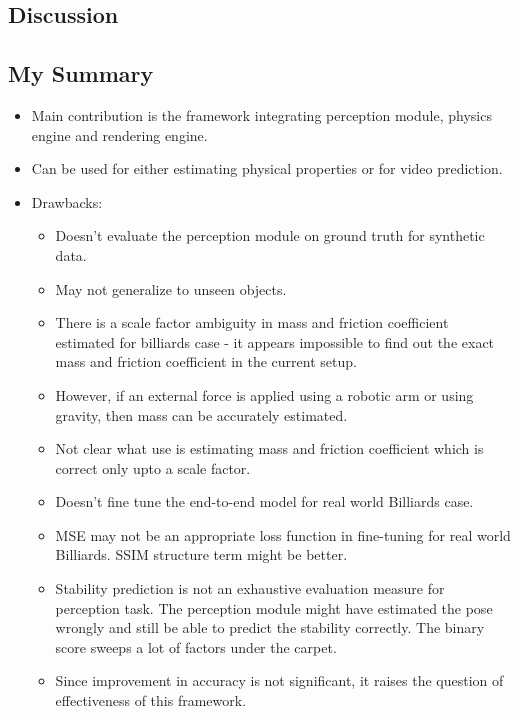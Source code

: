\documentclass{article}
\begin{document}
    \subsection{Discussion}\label{subsec:Learning_to_See_Physics_via_Visual_De_animation:discussion}

    \subsection{My Summary}\label{subsec:Learning_to_See_Physics_via_Visual_De_animation:my-summary}
    \begin{itemize}
        \item Main contribution is the framework integrating perception module, physics engine and rendering engine.
        \item Can be used for either estimating physical properties or for video prediction.
        \item Drawbacks:
        \begin{itemize}
            \item Doesn't evaluate the perception module on ground truth for synthetic data.
            \item May not generalize to unseen objects.
            \item There is a scale factor ambiguity in mass and friction coefficient estimated for billiards case - it appears impossible to find out the exact mass and friction coefficient in the current setup.
            \item However, if an external force is applied using a robotic arm or using gravity, then mass can be accurately estimated.
            \item Not clear what use is estimating mass and friction coefficient which is correct only upto a scale factor.
            \item Doesn't fine tune the end-to-end model for real world Billiards case.
            \item MSE may not be an appropriate loss function in fine-tuning for real world Billiards.
            SSIM structure term might be better.
            \item Stability prediction is not an exhaustive evaluation measure for perception task.
            The perception module might have estimated the pose wrongly and still be able to predict the stability correctly.
            The binary score sweeps a lot of factors under the carpet.
            \item Since improvement in accuracy is not significant, it raises the question of effectiveness of this framework.
        \end{itemize}
    \end{itemize}
    \newpage
\end{document}
